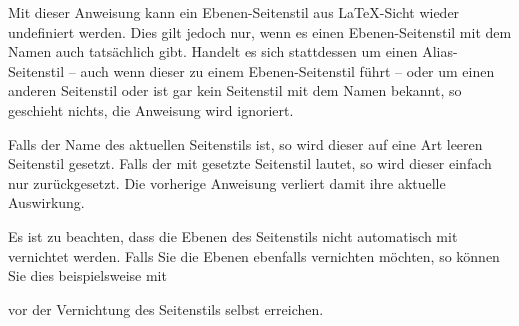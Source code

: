 \begin{Declaration}
\end{Declaration}
%
%
\iffalse%
Mit der Anweisung wird ein Ebenen-Seitenstil aus \LaTeX-Sicht undefiniert.
Wurde statt eines Ebenen-Seitenstils ein Alias-Seitenstil, ein anderer
Seitenstil oder ein unbekannter Seitenstil angegeben, so wird die Anweisung
ignoriert.%
\else%
Mit dieser Anweisung kann ein Ebenen-Seitenstil aus \LaTeX-Sicht wieder
undefiniert werden. Dies gilt jedoch nur, wenn es einen Ebenen-Seitenstil mit
dem Namen  auch tatsächlich gibt. Handelt es sich
stattdessen um einen Alias-Seitenstil -- auch wenn dieser zu einem
Ebenen-Seitenstil führt -- oder um einen anderen Seitenstil oder ist gar kein
Seitenstil mit dem Namen  bekannt, so geschieht
nichts, die Anweisung wird ignoriert.%
\fi

Falls  der Name des aktuellen Seitenstils ist,
so wird dieser auf eine Art leeren Seitenstil gesetzt. Falls der mit
 gesetzte Seitenstil
 lautet, so wird dieser einfach nur
zurückgesetzt. Die vorherige Anweisung 
verliert damit ihre aktuelle Auswirkung.

Es ist zu beachten, dass die Ebenen des Seitenstils nicht
automatisch mit vernichtet werden. Falls Sie die Ebenen ebenfalls vernichten
möchten, so können Sie dies beispielsweise mit
\begin{lstcode}
\end{lstcode}
vor der Vernichtung des Seitenstils selbst erreichen.%
\iffalse %
\par
Die Anweisung ist dazu bestimmt, innerhalb des Arguments \PName{Code} von
\DescRef{\LabelBase.cmd.scrlayerOnAutoRemoveInterface} (siehe
\autoref{sec:scrlayer.enduserinterfaces},
\DescPageRef{scrlayer.cmd.scrlayerOnAutoRemoveInterface}) verwendet zu
werden, um Seitenstile, die als Teil eines Endanwender-Interfaces definiert
wurden, beim automatischen Entfernen dieses Interfaces mit zu entfernen.%
\fi %
\EndIndexGroup
\EndIndexGroup


